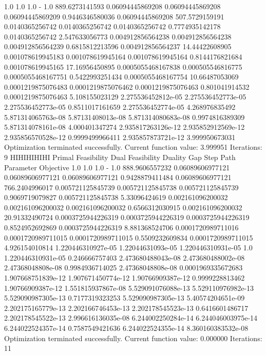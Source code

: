 \documentclass[letterpaper,10pt,english]{sphinxmanual}
\begin{document}
{\begin{sphinxVerbatim}[commandchars=\\\{\}]
1.0                 1.0                 1.0                 -                1.0                 889.6273141593
0.06094445869208    0.06094445869208    0.06094445869209    0.9446346580036  0.06094445869208    507.5729159191
0.0140365256742     0.0140365256742     0.0140365256742     0.7774935142178  0.0140365256742     2.547633056773
0.004912856564238   0.004912856564238   0.004912856564239   0.6815812213596  0.004912856564237   14.44422608905
0.001078619945183   0.001078619945164   0.001078619945164   0.8144176821684  0.001078619945165   17.16956450895
0.0005055468167838  0.000505546816775   0.0005055468167751  0.5422993251434  0.0005055468167754  10.66487053069
0.0001219875076483  0.0001219875076462  0.0001219875076463  0.801041914532   0.0001219875076463  5.108155023129
2.275536452812e-05  2.275536452773e-05  2.275536452773e-05  0.8511017161659  2.275536452774e-05  4.268976835492
5.871314065763e-08  5.87131408013e-08   5.871314080683e-08  0.9974816389309  5.871314078161e-08  4.000401347274
2.935817263126e-12  2.935852912569e-12  2.935856570528e-12  0.9999499966411  2.935857873721e-12  3.999950673031
Optimization terminated successfully.
         Current function value: 3.999951
         Iterations: 9
HIHIHIHIHI
Primal Feasibility  Dual Feasibility    Duality Gap         Step             Path Parameter      Objective
1.0                 1.0                 1.0                 -                1.0                 888.9606557232
0.06089606977121    0.06089606977121    0.06089606977121    0.9428879411484  0.06089606977121    766.2404996017
0.005721125845739   0.005721125845738   0.005721125845739   0.9069719079827  0.005721125845738   5.33096424619
0.002161096200032   0.002161096200032   0.002161096200032   0.6566312030915  0.002161096200032   20.91332490724
0.0003725944226319  0.0003725944226319  0.0003725944226319  0.8524952692869  0.0003725944226319  8.881368524706
0.0001720989711016  0.0001720989711015  0.0001720989711015  0.5509232609834  0.0001720989711015  4.926154010814
1.220446310927e-05  1.22044631093e-05   1.220446310931e-05  1.0              1.220446310931e-05  0.246666757403
2.473680488043e-08  2.473680488002e-08  2.47368048808e-08   0.9984936714025  2.47368048808e-08   0.0001969335672683
1.907668751839e-12  1.907671450774e-12  1.90766909387e-12   0.9999228813462  1.90766909387e-12   1.551815937867e-08
5.529091076088e-13  5.529110976982e-13  5.529090987305e-13  0.7177319323253  5.529090987305e-13  5.40574204651e-09
2.202175165779e-13  2.202166746453e-13  2.202178545523e-13  0.6416601486717  2.202178545522e-13  2.996616136035e-08
6.244002250284e-14  6.244046003975e-14  6.244022524357e-14  0.7587549421636  6.244022524355e-14  8.360160383532e-08
Optimization terminated successfully.
         Current function value: 0.000000
         Iterations: 11
\end{sphinxVerbatim}
}
\end{document}
